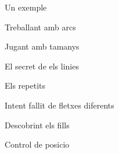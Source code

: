 \documentclass{article}
\begin{document}
Un exemple
\begin{figure}[htbp]
{
	
	\centerline{\box\graph}
}
\end{figure}

Treballant amb arcs
\begin{figure}[htbp]
{
	
	\centerline{\box\graph}
}
\end{figure}

Jugant amb tamanys
\begin{figure}[htbp]
{
	
	\centerline{\box\graph}
}
\end{figure}

\newpage
El secret de els linies
\begin{figure}[htbp]
{
	
	\centerline{\box\graph}
}
\end{figure}

Els repetits
\begin{figure}[htbp]
{
	
	\centerline{\box\graph}
}
\end{figure}

Intent fallit de fletxes diferents
\begin{figure}[htbp]
{
	
	\centerline{\box\graph}
}
\end{figure}

\newpage
Descobrint els fills
\begin{figure}[htbp]
{
	
	\centerline{\box\graph}
}
\end{figure}

Control de posicio
\begin{figure}[htbp]
{
	
	\centerline{\box\graph}
}
\end{figure}
\end{document}
